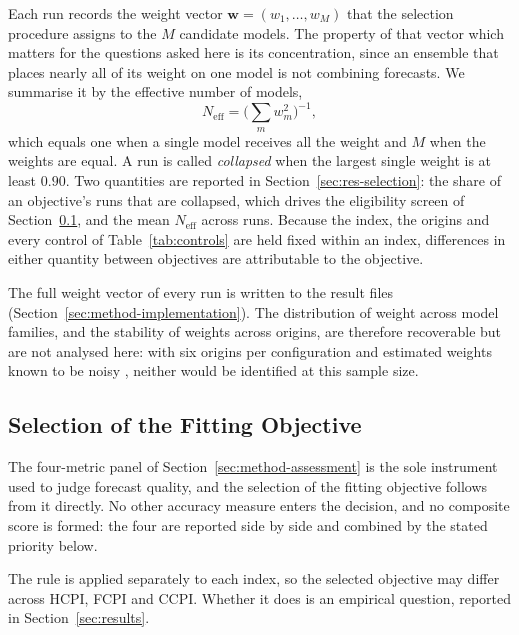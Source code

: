 \documentclass[12pt]{article}
\begin{document}
Each run records the weight vector $\mathbf{w} = (w_1, \dots, w_M)$ that the
selection procedure assigns to the $M$ candidate models. The property of that
vector which matters for the questions asked here is its concentration, since
an ensemble that places nearly all of its weight on one model is not combining
forecasts. We summarise it by the effective number of models,
\begin{equation}
    N_{\text{eff}} = \Big(\sum_{m} w_m^2\Big)^{-1},
    \label{eq:neff}
\end{equation}
which equals one when a single model receives all the weight and $M$ when the
weights are equal. A run is called \emph{collapsed} when the largest single
weight is at least $0.90$. Two quantities are reported in
Section~\ref{sec:res-selection}: the share of an objective's runs that are
collapsed, which drives the eligibility screen of
Section~\ref{sec:method-selection}, and the mean $N_{\text{eff}}$ across runs.
Because the index, the origins and every control of Table~\ref{tab:controls}
are held fixed within an index, differences in either quantity between
objectives are attributable to the objective.

The full weight vector of every run is written to the result files
(Section~\ref{sec:method-implementation}). The distribution of weight across
model families, and the stability of weights across origins, are therefore
recoverable but are not analysed here: with six origins per configuration and
estimated weights known to be noisy \citep{smith2009, claeskens2016}, neither
would be identified at this sample size.

\subsection{Selection of the Fitting Objective}
\label{sec:method-selection}

The four-metric panel of Section~\ref{sec:method-assessment} is the sole
instrument used to judge forecast quality, and the selection of the fitting
objective follows from it directly. No other accuracy measure enters the
decision, and no composite score is formed: the four are reported side by side
and combined by the stated priority below.

The rule is applied separately to each index, so the selected objective may
differ across HCPI, FCPI and CCPI. Whether it does is an empirical question,
reported in Section~\ref{sec:results}.
\end{document}
